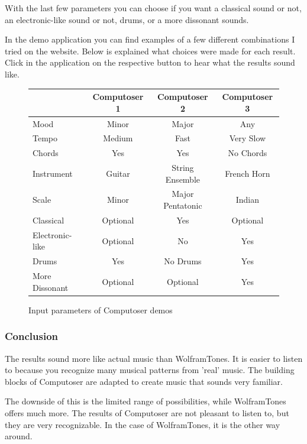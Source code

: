 \documentclass[12pt]{article}
\begin{document}
With the last few parameters you can choose if you want a classical sound or not, an electronic-like sound or not, drums, or a more dissonant sounds.
\newline

In the demo application you can find examples of a few different combinations I tried on the website. Below is explained what choices were made for each result. Click in the application on the respective button to hear what the results sound like.
\newline

\begin{figure}
\begin{tabular}[]{| l |  c | c | c |}
\hline
& Computoser 1 & Computoser 2 & Computoser 3 \\ \hline
Mood & Minor & Major & Any \\
Tempo & Medium & Fast & Very Slow \\
Chords & Yes & Yes & No Chords \\
Instrument & Guitar & String Ensemble & French Horn \\
Scale & Minor & Major Pentatonic & Indian \\
Classical & Optional & Yes & Optional \\
Electronic-like & Optional & No & Yes\\
Drums & Yes & No Drums & Yes \\
More Dissonant & Optional & Optional & Yes \\
\hline
\end{tabular}
\caption{Input parameters of Computoser demos}
\end{figure}

\newpage

\subsubsection{Conclusion}

The results sound more like actual music than WolframTones. It is easier to listen to because you recognize many musical patterns from 'real' music. The building blocks of Computoser are adapted to create music that sounds very familiar.
\newline

The downside of this is the limited range of possibilities, while WolframTones offers much more. The results of Computoser are not pleasant to listen to, but they are very recognizable. In the case of WolframTones, it is the other way around.  
\newpage
\end{document}
